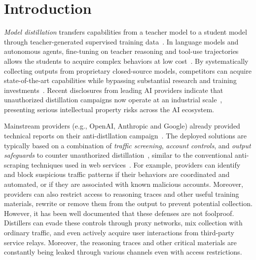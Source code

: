 \section{Introduction}
\label{sec:introduction}

\emph{Model distillation} transfers capabilities from a teacher model to a student model through teacher-generated supervised training data~\cite{hinton2015distilling}. In language models and autonomous agents, fine-tuning on teacher reasoning and tool-use trajectories allows the students to acquire complex behaviors at low cost~\cite{hsieh2023distilling, mukherjee2023orca, liu2026structured, kang2026distilling}. By systematically collecting outputs from proprietary closed-source models, competitors can acquire state-of-the-art capabilities while bypassing substantial research and training investments~\cite{anthropicDetectingPreventing}. Recent disclosures from leading AI providers indicate that unauthorized distillation campaigns now operate at an industrial scale~\cite{OpenAIkey, googleGTIGThreat, anthropicDetectingPreventing}, presenting serious intellectual property risks across the AI ecosystem.


Mainstream providers (e.g., OpenAI, Anthropic and Google) already provided technical reports on their anti-distllation campaign~\cite{OpenAIkey, googleGTIGThreat, anthropicDetectingPreventing}. The deployed solutions are typically based on a combination of \emph{traffic screening}, \emph{account controls}, and \emph{output safeguards} to counter unauthorized distillation~\cite{anthropicDetectingPreventing}, similar to the conventional anti-scraping techniques used in web services~\cite{li2026webcloak, wilson2025predictive}.
For example, providers can identify and block suspicious traffic patterns if their behaviors are coordinated and automated, or if they are associated with known malicious accounts.
Moreover, providers can also restrict access to reasoning traces and other useful training materials, rewrite or remove them from the output to prevent potential collection. 
However, it has been well documented that these defenses are not foolproof. Distillers can evade these controls through proxy networks, mix collection with ordinary traffic, and even actively acquire user interactions from third-party service relays. Moreover, the reasoning traces and other critical materials are constantly being leaked through various channels even with access restrictions\cite{panfilov2026stealing, hui2024pleak}.


